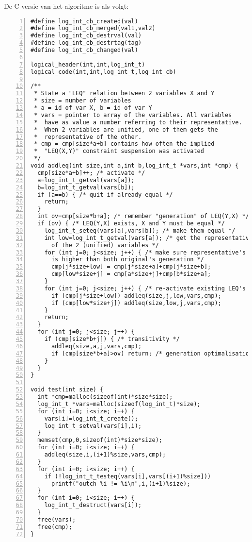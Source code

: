 \label{code:leq-c}

De C versie van het algoritme is als volgt:

{\scriptsize
\begin{Verbatim}[frame=single,numbers=left]
#define log_int_cb_created(val)
#define log_int_cb_merged(val1,val2)
#define log_int_cb_destrval(val)
#define log_int_cb_destrtag(tag)
#define log_int_cb_changed(val)

logical_header(int,int,log_int_t)
logical_code(int,int,log_int_t,log_int_cb)

/**
 * State a "LEQ" relation between 2 variables X and Y
 * size = number of variables
 * a = id of var X, b = id of var Y
 * vars = pointer to array of the variables. All variables
 *  have as value a number referring to their representative.
 *  When 2 variables are unified, one of them gets the
 *  representative of the other.
 * cmp = cmp[size*a+b] contains how often the implied
 *  "LEQ(X,Y)" constraint suspension was activated
 */
void addleq(int size,int a,int b,log_int_t *vars,int *cmp) {
  cmp[size*a+b]++; /* activate */
  a=log_int_t_getval(vars[a]);
  b=log_int_t_getval(vars[b]);
  if (a==b) { /* quit if already equal */
    return;
  }
  int ov=cmp[size*b+a]; /* remember "generation" of LEQ(Y,X) */
  if (ov) { /* LEQ(Y,X) exists, X and Y must be equal */
    log_int_t_seteq(vars[a],vars[b]); /* make them equal */
    int low=log_int_t_getval(vars[a]); /* get the representative 
      of the 2 (unified) variables */
    for (int j=0; j<size; j++) { /* make sure representative's generation
      is higher than both original's generation */
      cmp[j*size+low] = cmp[j*size+a]+cmp[j*size+b];
      cmp[low*size+j] = cmp[a*size+j]+cmp[b*size+a];
    }
    for (int j=0; j<size; j++) { /* re-activate existing LEQ's */
      if (cmp[j*size+low]) addleq(size,j,low,vars,cmp);
      if (cmp[low*size+j]) addleq(size,low,j,vars,cmp);
    }
    return;
  }
  for (int j=0; j<size; j++) {
    if (cmp[size*b+j]) { /* transitivity */
      addleq(size,a,j,vars,cmp);
      if (cmp[size*b+a]>ov) return; /* generation optimalisation */
    }
  }
}

void test(int size) {
  int *cmp=malloc(sizeof(int)*size*size);
  log_int_t *vars=malloc(sizeof(log_int_t)*size);
  for (int i=0; i<size; i++) {
    vars[i]=log_int_t_create();
    log_int_t_setval(vars[i],i);
  }
  memset(cmp,0,sizeof(int)*size*size);
  for (int i=0; i<size; i++) {
    addleq(size,i,(i+1)%size,vars,cmp);
  }
  for (int i=0; i<size; i++) {
    if (!log_int_t_testeq(vars[i],vars[(i+1)%size]))
      printf("outch %i != %i\n",i,(i+1)%size);
  }
  for (int i=0; i<size; i++) {
    log_int_t_destruct(vars[i]);
  }
  free(vars);
  free(cmp);
}
\end{Verbatim}
}

